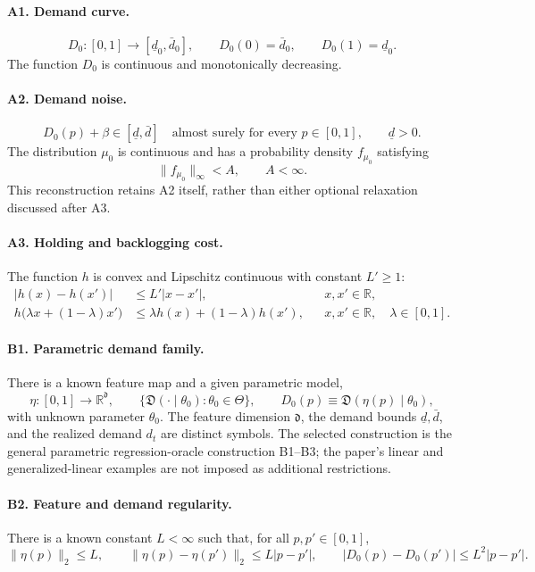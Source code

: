 \documentclass[11pt]{article}
\begin{document}
\paragraph{A1. Demand curve.}
\[
D_0:[0,1]\longrightarrow[\underline d_0,\bar d_0],
\qquad D_0(0)=\bar d_0,\qquad D_0(1)=\underline d_0.
\]
The function \(D_0\) is continuous and monotonically decreasing.

\paragraph{A2. Demand noise.}
\[
D_0(p)+\beta\in[\underline d,\bar d]
\quad\text{almost surely for every }p\in[0,1],
\qquad \underline d>0.
\]
The distribution \(\mu_0\) is continuous and has a probability density \(f_{\mu_0}\) satisfying
\[
\|f_{\mu_0}\|_{\infty}<A,\qquad A<\infty.
\]
This reconstruction retains A2 itself, rather than either optional relaxation discussed after A3.

\paragraph{A3. Holding and backlogging cost.}
The function \(h\) is convex and Lipschitz continuous with constant \(L'\geq1\):
\[
\begin{aligned}
|h(x)-h(x')|&\leq L'|x-x'|,
&&x,x'\in\mathbb{R},\\
h\bigl(\lambda x+(1-\lambda)x'\bigr)
&\leq\lambda h(x)+(1-\lambda)h(x'),
&&x,x'\in\mathbb{R},\quad\lambda\in[0,1].
\end{aligned}
\]

\paragraph{B1. Parametric demand family.}
There is a known feature map and a given parametric model,
\[
\eta:[0,1]\longrightarrow\mathbb{R}^{\mathfrak d},
\qquad
\{\mathfrak D(\cdot\mid\theta_0):\theta_0\in\Theta\},
\qquad
D_0(p)\equiv\mathfrak D(\eta(p)\mid\theta_0),
\]
with unknown parameter \(\theta_0\). The feature dimension \(\mathfrak d\), the demand bounds \(\underline d,\bar d\), and the realized demand \(d_t\) are distinct symbols. The selected construction is the general parametric regression-oracle construction B1--B3; the paper's linear and generalized-linear examples are not imposed as additional restrictions.

\paragraph{B2. Feature and demand regularity.}
There is a known constant \(L<\infty\) such that, for all \(p,p'\in[0,1]\),
\[
\|\eta(p)\|_2\leq L,\qquad
\|\eta(p)-\eta(p')\|_2\leq L|p-p'|,\qquad
|D_0(p)-D_0(p')|\leq L^2|p-p'|.
\]
\end{document}
